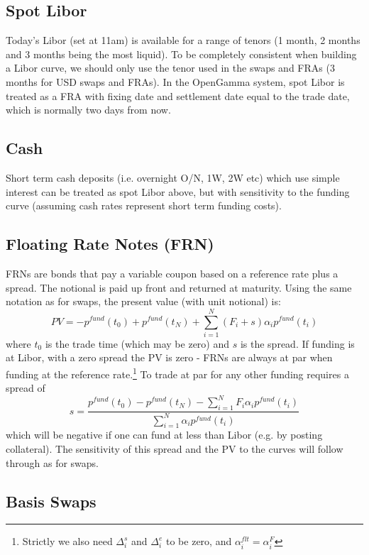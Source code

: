 \subsection{Spot Libor}
Today's Libor (set at 11am) is available for a range of tenors (1 month, 2 months and 3 months being the most liquid). To be completely consistent when building a Libor curve, we should only use the tenor used in the swaps and FRAs (3 months for USD swaps and FRAs). In the OpenGamma system, spot Libor is treated as a FRA with fixing date and settlement date equal to the trade date, which is normally two days from now.

\subsection{Cash}
Short term cash deposits (i.e. overnight O/N, 1W, 2W etc) which use simple interest can be treated as spot Libor above, but with sensitivity to the funding curve (assuming cash rates represent short term funding costs).  

\subsection{Floating Rate Notes (FRN)}
\label{sec:FRN}
FRNs are bonds that pay a variable coupon based on a reference rate plus a spread. The notional is paid up front and returned at maturity. Using the same notation as for swaps, the present value (with unit notional)  is:
%
\begin{equation}
PV = - p^{fund}(t_0) + p^{fund}(t_N) +  \sum^N_{i=1} (F_i+s) \alpha_ip^{fund}(t_i)
\end{equation}
%
where  $t_0$ is the trade time (which may be zero) and $s$ is the spread. If funding is at Libor, with a zero spread the PV is zero - FRNs are always at par when funding at the reference rate.\footnote{Strictly we  also need $\Delta^s_i$ and  $\Delta^e_i$ to be zero, and $\alpha^{flt}_i=\alpha^F_i$}
To trade at par for any other funding requires a spread of
%
\begin{equation}
s =  \frac{p^{fund}(t_0) - p^{fund}(t_N)- \sum^N_{i=1} F_i \alpha_ip^{fund}(t_i) }{ \sum^N_{i=1} \alpha_ip^{fund}(t_i)}
\end{equation}
%
which will be negative if one can fund at less than Libor (e.g. by posting collateral). The sensitivity of this spread and the PV to the curves will follow through as for swaps. 

\subsection{Basis Swaps}

